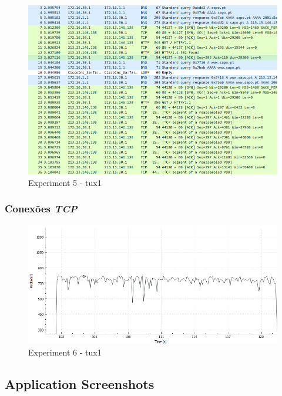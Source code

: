 \documentclass[a4paper]{article}
\begin{document}
	\begin{figure}[H]
	\begin{center}
  	\includegraphics[width=\linewidth]{exp5_tux1.png}
  	\caption{Experiment 5 - tux1}
  	\label{fig:Experiment 5 - tux1}
	\end{center}
	\end{figure}

	\subsubsection{Conexões \textit{TCP}}

	\begin{figure}[H]
	\begin{center}
  	\includegraphics[width=\linewidth]{exp6_tux1.png}
  	\caption{Experiment 6 - tux1}
  	\label{fig:Experiment 6 - tux1}
	\end{center}
	\end{figure}

	\subsection{Application Screenshots}
\end{document}
